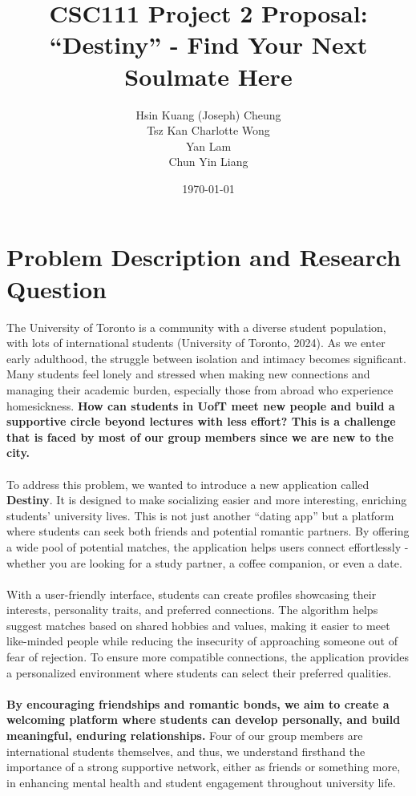 \documentclass[fontsize=11pt]{article}
\title{CSC111 Project 2 Proposal: \\ \textbf{“Destiny” - Find Your Next Soulmate Here}}
\author{Hsin Kuang (Joseph) Cheung \\ Tsz Kan Charlotte Wong \\ Yan Lam \\ Chun Yin Liang}
\date{\today}
\begin{document}
\maketitle

\section*{Problem Description and Research Question}

The University of Toronto is a community with a diverse student population, with lots of international students (University of Toronto, 2024).
As we enter early adulthood, the struggle between isolation and intimacy becomes significant.
Many students feel lonely and stressed when making new connections and managing their academic burden, especially those from abroad who experience homesickness.
\textbf{How can students in UofT meet new people and build a supportive circle beyond lectures with less effort?
This is a challenge that is faced by most of our group members since we are new to the city.}
\\
\\
To address this problem, we wanted to introduce a new application called \textbf{Destiny}.
It is designed to make socializing easier and more interesting, enriching students’ university lives.
This is not just another “dating app” but a platform where students can seek both friends and potential romantic partners. By offering a wide pool of potential matches, the application helps users connect effortlessly - whether you are looking for a study partner, a coffee companion, or even a date. 
\\
\\
With a user-friendly interface, students can create profiles showcasing their interests, personality traits, and preferred connections.
The algorithm helps suggest matches based on shared hobbies and values, making it easier to meet like-minded people while reducing the insecurity of approaching someone out of fear of rejection. To ensure more compatible connections, the application provides a personalized environment where students can select their preferred qualities. 
\\
\\
\textbf{By encouraging friendships and romantic bonds, we aim to create a welcoming platform where students can develop personally, and build meaningful, enduring relationships.}
Four of our group members are international students themselves, and thus, we understand firsthand the importance of a strong supportive network, either as friends or something more, in enhancing mental health and student engagement throughout university life.
\end{document}
